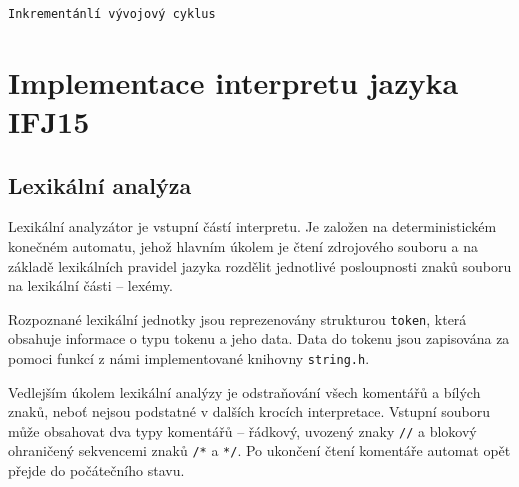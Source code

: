 \documentclass[a4paper, 12pt]{article}
\begin{document}
\begin{verbatim}
Inkrementánlí vývojový cyklus
\end{verbatim}

\newpage

\section{Implementace interpretu jazyka IFJ15} \label{implementace}
\subsection{Lexikální analýza} \label{lexer}

Lexikální analyzátor je vstupní částí interpretu. Je založen na deterministickém
konečném automatu, jehož hlavním úkolem je čtení zdrojového souboru a na základě
lexikálních pravidel jazyka rozdělit jednotlivé posloupnosti znaků
souboru na lexikální části -- lexémy.

Rozpoznané lexikální jednotky jsou reprezenovány strukturou \texttt{token},
která obsahuje informace o typu tokenu a jeho data. Data do tokenu jsou
zapisována za pomoci funkcí z námi implementované knihovny \texttt{string.h}.


Vedlejším úkolem lexikální analýzy je odstraňování všech komentářů a bílých
znaků, neboť nejsou podstatné v dalších krocích interpretace. Vstupní souboru
může obsahovat dva typy komentářů -- řádkový, uvozený znaky
\texttt{//} a blokový ohraničený sekvencemi znaků
\texttt{/*} a \texttt{*/}. Po ukončení čtení komentáře automat opět přejde
do počátečního stavu.
\end{document}
